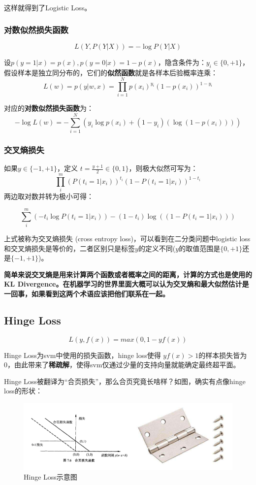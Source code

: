\documentclass[12pt]{article}
\begin{document}
这样就得到了Logistic Loss。

\subsubsection{对数似然损失函数}
$$
L(Y,P(Y|X))=-\log{P(Y|X)}
$$

设$p(y=1|x)=p(x),p(y=0|x)=1-p(x)$，隐含条件为：$y_i\in\{0,+1\}$，假设样本是独立同分布的，它们的\textbf{似然函数}就是各样本后验概率连乘：
$$
L(w) = p(y|w,x)= \prod_{i=1}^{N}p(x_i)^{y_i}(1-p(x_i))^{1-y_i}
$$

对应的\textbf{对数似然损失函数}为：
$$
-\log{L(w)} = - \sum_{i=1}^{N}(y_i\log{p(x_i)}+(1-y_i)(\log{(1-p(x_i))}))
$$


\subsubsection{交叉熵损失}
如果$y\in\{-1,+1\}$，定义 $t=\frac{y+1}{2} \in \{0, 1\}$，则极大似然可写为：
$$\prod_i^m(P(t_i=1|x_i))^{t_i}(1-P(t_i=1|x_i))^{1-t_i}$$
两边取对数并转为极小可得：

$$\sum_i^m(-t_i\log{P(t_i=1|x_i)})-(1-t_i)\log((1-P(t_i=1|x_i)))$$

上式被称为交叉熵损失 (cross entropy loss)，可以看到在二分类问题中logistic loss和交叉熵损失是等价的，二者区别只是标签$y$的定义不同($y$的取值范围是$\{0,+1\}$还是$\{-1,+1\}$)。

\textbf{简单来说交叉熵是用来计算两个函数或者概率之间的距离，计算的方式也是使用的KL Divergence。在机器学习的世界里面大概可以认为交叉熵和最大似然估计是一回事，如果看到这两个术语应该把他们联系在一起。}

\subsection{Hinge Loss}
$$L(y,f(x))=max(0,1-yf(x))$$

Hinge Loss为svm中使用的损失函数，hinge loss使得 $yf(x) > 1$的样本损失皆为0，由此带来了\textbf{稀疏解}，使得svm仅通过少量的支持向量就能确定最终超平面。

Hinge Loss被翻译为“合页损失”，那么合页究竟长啥样？如图，确实有点像hinge loss的形状：
\begin{figure}[ht]
  \centering
  \includegraphics[width=.8\textwidth]{fig/HingeLossExample.png} %
  \caption{Hinge Loss示意图} %
  \label{HingeLossExample} %
\end{figure}
\end{document}
